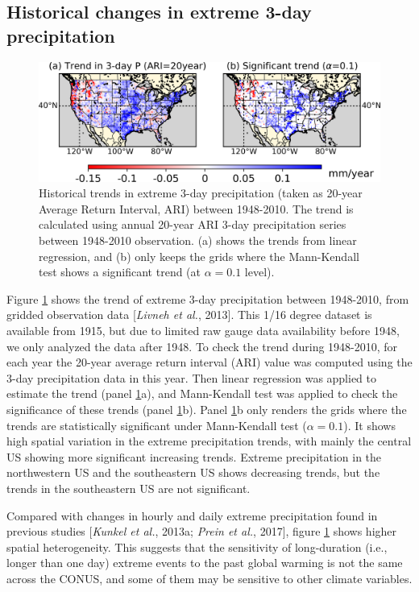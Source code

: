 \subsection{Historical changes in extreme 3-day precipitation}

\begin{figure}[htbp]
	\includegraphics[width=\linewidth]{pics/ch4/fig3.png}
	\caption{Historical trends in extreme 3-day precipitation (taken as 20-year Average Return Interval, ARI) between 1948-2010. The trend is calculated using annual 20-year ARI 3-day precipitation series between 1948-2010 observation. (a) shows the trends from linear regression, and (b) only keeps the grids where the Mann-Kendall test shows a significant trend (at $\alpha=0.1$ level).}
	\label{fig:4-3}
\end{figure}

Figure \ref{fig:4-3} shows the trend of extreme 3-day precipitation between 1948-2010, from gridded observation data [\textit{Livneh et al.}, 2013]. This 1/16 degree dataset is available from 1915, but due to limited raw gauge data availability before 1948, we only analyzed the data after 1948. To check the trend during 1948-2010, for each year the 20-year average return interval (ARI) value was computed using the 3-day precipitation data in this year. Then linear regression was applied to estimate the trend (panel \ref{fig:4-3}a), and Mann-Kendall test was applied to check the significance of these trends (panel \ref{fig:4-3}b). Panel \ref{fig:4-3}b only renders the grids where the trends are statistically significant under Mann-Kendall test ($\alpha=0.1$). It shows high spatial variation in the extreme precipitation trends, with mainly the central US showing more significant increasing trends. Extreme precipitation in the northwestern US and the southeastern US shows decreasing trends, but the trends in the southeastern US are not significant.

Compared with changes in hourly and daily extreme precipitation found in previous studies [\textit{Kunkel et al.}, 2013a; \textit{Prein et al.}, 2017], figure \ref{fig:4-3} shows higher spatial heterogeneity. This suggests that the sensitivity of long-duration (i.e., longer than one day) extreme events to the past global warming is not the same across the CONUS, and some of them may be sensitive to other climate variables.

